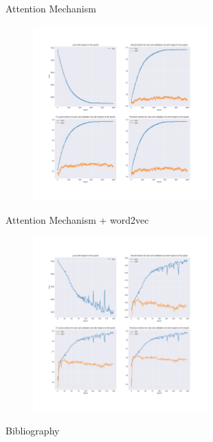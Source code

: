 \documentclass{beamer}
\begin{document}
	\begin{frame}{Attention Mechanism}
		\begin{figure}
			\centering
			\includegraphics[width=0.6\textwidth]{attention3.pdf}
		\end{figure}
	\end{frame}
	\begin{frame}{Attention Mechanism + word2vec}
	\begin{figure}
			\centering
			\includegraphics[width=0.6\textwidth]{attention1.pdf}
		\end{figure}
	\end{frame}
  \begin{frame}[allowframebreaks]{Bibliography}
    
	
	\note{}
  \end{frame}
\end{document}
